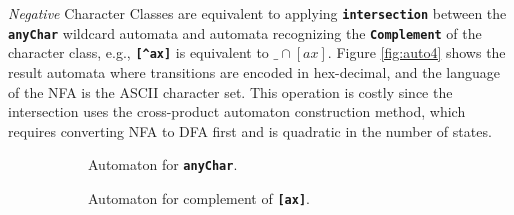 \textit{Negative} Character Classes are equivalent to applying \texttt{\textbf{intersection}} between the \texttt{\textbf{anyChar}} wildcard automata and automata recognizing the \texttt{\textbf{Complement}} of the character class, e.g., \texttt{\textbf{[\textasciicircum ax]}} is equivalent to \texttt{\textbf{$\_ \cap [ax]$}}. Figure \ref{fig:auto4} shows the result automata where transitions are encoded in hex-decimal, and the language of the NFA is the ASCII character set. This operation is costly since the intersection uses the cross-product automaton construction method, which requires converting NFA to DFA first and is quadratic in the number of states.

\begin{figure}[htbp]

\begin{subfigure}[b]{0.5\textwidth}
\centering
{}
\caption{Automaton for \texttt{\textbf{anyChar}}.}
\label{fig:auto41}
\end{subfigure}
\hfill
\begin{subfigure}[b]{0.5\textwidth}
\centering
{}
\caption{Automaton for complement of \texttt{\textbf{[ax]}}.}
\label{fig:auto42}
\end{subfigure}\\


\begin{subfigure}[b]{\textwidth}
\centering
{}
\end{subfigure}
\end{figure}
